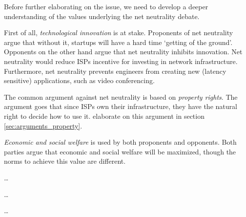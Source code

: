 
Before further elaborating on the issue, we need to develop a deeper understanding of the values underlying the net neutrality debate.

First of all, \emph{technological innovation} is at stake. Proponents of net neutrality argue that without it, startups will have a hard time `getting of the ground'. Opponents on the other hand argue that net neutrality inhibits innovation. Net neutrality would reduce ISPs incentive for investing in network infrastructure. Furthermore, net neutrality prevents engineers from creating new (latency sensitive) applications, such as video conferencing.

The common argument against net neutrality is based on \emph{property rights}. The argument goes that since ISPs own their infrastructure, they have the natural right to decide how to use it.  elaborate on this argument in section \ref{sec:arguments_property}.

\emph{Economic and social welfare} is used by both proponents and opponents. Both parties argue that economic and social welfare will be maximized, though the norms to achieve this value are different.

\ldots

\ldots

\ldots